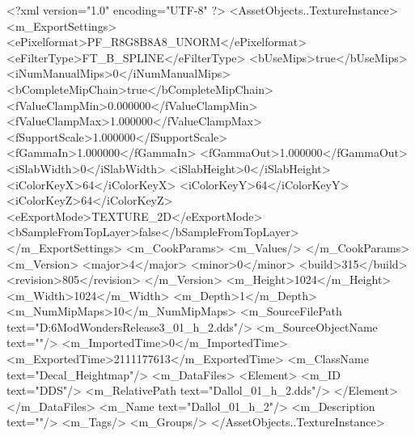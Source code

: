 <?xml version="1.0" encoding="UTF-8" ?>
<AssetObjects..TextureInstance>
	<m_ExportSettings>
		<ePixelformat>PF_R8G8B8A8_UNORM</ePixelformat>
		<eFilterType>FT_B_SPLINE</eFilterType>
		<bUseMips>true</bUseMips>
		<iNumManualMips>0</iNumManualMips>
		<bCompleteMipChain>true</bCompleteMipChain>
		<fValueClampMin>0.000000</fValueClampMin>
		<fValueClampMax>1.000000</fValueClampMax>
		<fSupportScale>1.000000</fSupportScale>
		<fGammaIn>1.000000</fGammaIn>
		<fGammaOut>1.000000</fGammaOut>
		<iSlabWidth>0</iSlabWidth>
		<iSlabHeight>0</iSlabHeight>
		<iColorKeyX>64</iColorKeyX>
		<iColorKeyY>64</iColorKeyY>
		<iColorKeyZ>64</iColorKeyZ>
		<eExportMode>TEXTURE_2D</eExportMode>
		<bSampleFromTopLayer>false</bSampleFromTopLayer>
	</m_ExportSettings>
	<m_CookParams>
		<m_Values/>
	</m_CookParams>
	<m_Version>
		<major>4</major>
		<minor>0</minor>
		<build>315</build>
		<revision>805</revision>
	</m_Version>
	<m_Height>1024</m_Height>
	<m_Width>1024</m_Width>
	<m_Depth>1</m_Depth>
	<m_NumMipMaps>10</m_NumMipMaps>
	<m_SourceFilePath text="D:\Civ6Mod\Terrain\NW\Natural Wonders\TM Release3\Dallol\Dallol_01_h_2.dds"/>
	<m_SourceObjectName text=""/>
	<m_ImportedTime>0</m_ImportedTime>
	<m_ExportedTime>2111177613</m_ExportedTime>
	<m_ClassName text="Decal_Heightmap"/>
	<m_DataFiles>
		<Element>
			<m_ID text="DDS"/>
			<m_RelativePath text="Dallol_01_h_2.dds"/>
		</Element>
	</m_DataFiles>
	<m_Name text="Dallol_01_h_2"/>
	<m_Description text=""/>
	<m_Tags/>
	<m_Groups/>
</AssetObjects..TextureInstance>

